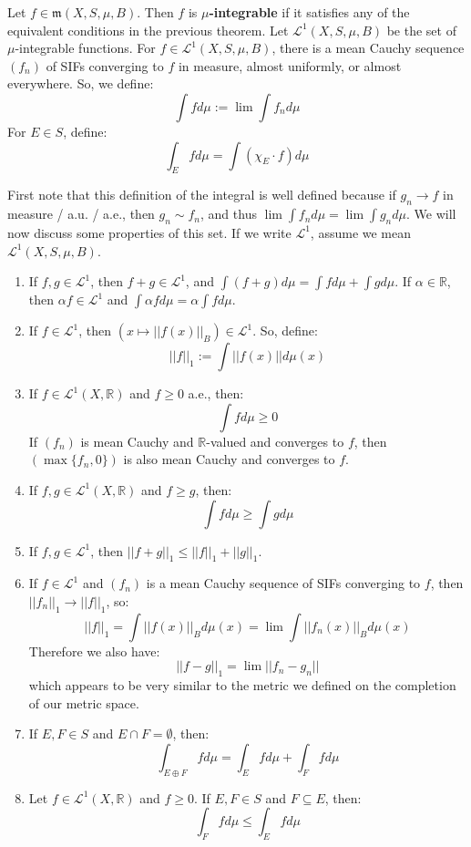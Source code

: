 	\begin{definition}[$\mu$-integrable]
		Let $f\in\mathfrak m(X, S, \mu, B)$. Then $f$ is \textbf{$\mu$-integrable} if it satisfies any of the equivalent 
		conditions in the previous theorem. Let $\mathcal L^1(X, S, \mu, B)$ be the set of $\mu$-integrable functions. For 
		$f\in\mathcal L^1(X, S, \mu, B)$, there is a mean Cauchy sequence $(f_n)$ of SIFs converging to $f$ in measure, 
		almost uniformly, or almost everywhere. So, we define:
		$$
			\int fd\mu := \lim\int f_nd\mu
		$$
		For $E\in S$, define:
		$$
			\int_E fd\mu = \int (\chi_E\cdot f)d\mu
		$$
	\end{definition}
	
	First note that this definition of the integral is well defined because if $g_n\rightarrow f$ in measure / a.u. / a.e., then 
	$g_n\sim f_n$, and thus $\lim\int f_nd\mu = \lim\int g_nd\mu$. We will now discuss some properties of this set. 
	If we write $\mathcal L^1$, assume we mean $\mathcal L^1(X, S, \mu, B)$. 
	
	\begin{enumerate}
		\item If $f, g\in\mathcal L^1$, then $f + g\in\mathcal L^1$, and $\int(f + g)d\mu = \int fd\mu + \int gd\mu$. If $\alpha
		\in\mathbb R$, then $\alpha f\in\mathcal L^1$ and $\int\alpha fd\mu = \alpha\int fd\mu$. 
		
		\item If $f\in\mathcal L^1$, then $(x\mapsto ||f(x)||_B)\in\mathcal L^1$. So, define:
		$$
			||f||_1 := \int ||f(x)||d\mu(x)
		$$
		
		\item If $f\in\mathcal L^1(X, \mathbb R)$ and $f\geq 0$ a.e., then:
		$$
			\int fd\mu\geq 0
		$$
		If $(f_n)$ is mean Cauchy and $\mathbb R$-valued and converges to $f$, then $(\max\{f_n, 0\})$ is also mean 
		Cauchy and converges to $f$.
		
		\item If $f, g\in\mathcal L^1(X, \mathbb R)$ and $f\geq g$, then:
		$$
			\int fd\mu\geq\int gd\mu
		$$
		
		\item If $f, g\in\mathcal L^1$, then $||f + g||_1\leq ||f||_1 + ||g||_1$.
		
		\item If $f\in\mathcal L^1$ and $(f_n)$ is a mean Cauchy sequence of SIFs converging to $f$, then 
		$||f_n||_1\rightarrow ||f||_1$, so:
		$$
			||f||_1 = \int ||f(x)||_Bd\mu(x) = \lim\int ||f_n(x)||_Bd\mu(x)
		$$
		Therefore we also have:
		$$
			||f - g||_1 = \lim||f_n - g_n||
		$$
		which appears to be very similar to the metric we defined on the completion of our metric space. 
		
		\item If $E, F\in S$ and $E\cap F = \emptyset$, then:
		$$
			\int_{E\oplus F} fd\mu = \int_E fd\mu + \int_F fd\mu
		$$
		
		\item Let $f\in\mathcal L^1(X, \mathbb R)$ and $f\geq 0$. If $E, F\in S$ and $F\subseteq E$, then:
		$$
			\int_F fd\mu\leq\int_E fd\mu
		$$
	\end{enumerate}
	
